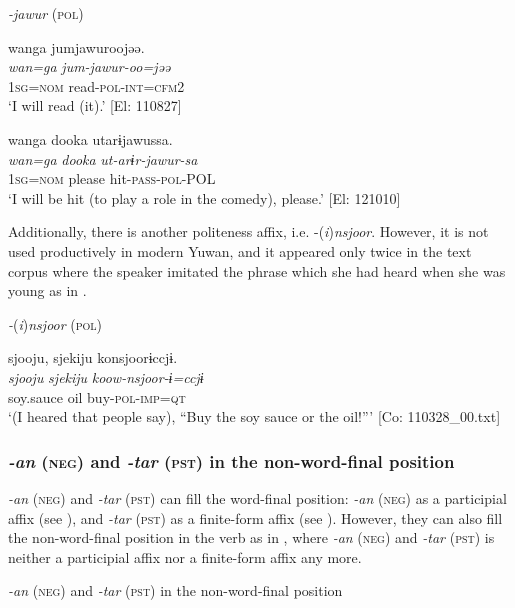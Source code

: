 \ea\label{ex:8-143}
  \textit{-jawur} (\textsc{pol})

\ea {\TM}
\glll  wanga  jumjawuroojəə.\\
\textit{wan=ga}  \textit{jum-jawur-oo=jəə}\\
1\textsc{sg}=\textsc{nom}  read-\textsc{pol}-\textsc{int}=\textsc{cfm2}\\
\glt ‘I will read (it).’ [El: 110827]

\ex
{\TM}
\glll  wanga  dooka  utarɨjawussa.\\
\textit{wan=ga}  \textit{dooka}  \textit{ut-arɨr-jawur-sa}\\
1\textsc{sg}=\textsc{nom}  please  hit-\textsc{pass}-\textsc{pol}-POL\\
\glt ‘I will be hit (to play a role in the comedy), please.’ [El: 121010]
\z
\z

  Additionally, there is another politeness affix, i.e. -(\textit{i})\textit{nsjoor}. However, it is not used productively in modern Yuwan, and it appeared only twice in the text corpus where the speaker imitated the phrase which she had heard when she was young as in .

\ea\label{ex:8-144}
  \textit{-}(\textit{i})\textit{nsjoor} (\textsc{pol})

  {\TM}
\glll  {\textbar}sjooju,  sjekiju{\textbar}  konsjoorɨccjɨ.\\
\textit{sjooju}  \textit{sjekiju}  \textit{koow-nsjoor-ɨ=ccjɨ}\\
    soy.sauce  oil  buy-\textsc{pol}-\textsc{imp}=\textsc{qt}\\
\glt ‘(I heared that people say), “Buy the soy sauce or the oil!”’ [Co: 110328\_00.txt]
\z

\subsubsection{\textit{-an} (\textsc{neg}) and \textit{-tar} (\textsc{pst}) in the non-word-final position}

\textit{-an} (\textsc{neg}) and \textit{-tar} (\textsc{pst}) can fill the word-final position: \textit{-an} (\textsc{neg}) as a participial affix (see ), and \textit{-tar} (\textsc{pst}) as a finite-form affix (see ). However, they can also fill the non-word-final position in the verb as in , where \textit{-an} (\textsc{neg}) and \textit{-tar} (\textsc{pst}) is neither a participial affix nor a finite-form affix any more.

\ea\label{ex:8-145}
  \textit{-an} (\textsc{neg}) and \textit{-tar} (\textsc{pst}) in the non-word-final position

